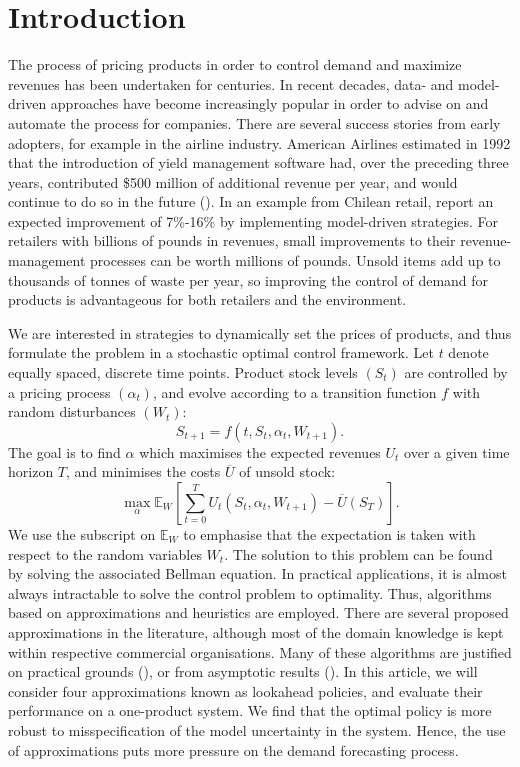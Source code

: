 \documentclass[main.tex]{subfiles}
\begin{document}
\listoftodos

\section{Introduction}
The process of pricing products in order to control demand and
maximize revenues has been undertaken for centuries. In recent
decades, data- and model-driven approaches have become increasingly
popular in order to advise on and automate the process for companies.
There are several success stories from early adopters, for example in
the airline industry. American Airlines estimated in 1992 that
the introduction of yield management software had, over the preceding
three years, contributed \$500 million of additional revenue per year,
and would continue to do so in the future (\citet{smith1992yield}).
In an example from Chilean retail, \citet{bitran1998coordinating}
report an expected improvement of 7\%-16\% by implementing
model-driven strategies.
For retailers with billions of pounds in revenues, small
improvements to their revenue-management processes can be worth millions
of pounds.
Unsold items add up to thousands of tonnes of waste per year, so
improving the control of demand for products is advantageous
for both retailers and the environment.

We are interested in strategies to dynamically set the prices of
products, and thus
formulate the problem in a stochastic optimal control framework.
Let $t$ denote equally spaced, discrete time points.
Product stock levels $(S_t)$ are controlled by a pricing process
$(\alpha_t)$, and evolve according to a transition function $f$ with random disturbances
$(W_t)$:
\begin{equation}
  S_{t+1}=f(t,S_t,\alpha_t,W_{t+1}).
\end{equation}
The goal is to find $\alpha$ which maximises the expected revenues $U_t$ over a
given time horizon $T$, and
minimises the costs $\overline{U}$ of unsold stock:
\begin{equation}
  \max_{\alpha}\mathbb E_W\left[ \sum_{t=0}^TU_t(S_t,\alpha_t,W_{t+1})
    - \overline{U}(S_T)\right].
\end{equation}
We use the subscript on $\mathbb E_W$ to emphasise that the
expectation is taken with respect to the random variables $W_t$.
The solution to this problem can be found by solving the associated
Bellman equation. In practical applications, it is almost always
intractable to solve the control problem to optimality.
Thus, algorithms based on approximations and heuristics are employed.
There are several proposed approximations in the
literature, although most of the domain knowledge is kept within
respective commercial organisations.
Many of these algorithms are justified on practical grounds
(\citet{aviv2012dynamic}), or
from asymptotic results (\citet{gallego1994optimal}).
In this article, we will consider four approximations known as
lookahead policies,
and evaluate their performance on a one-product system.
We find that the optimal policy is more robust to
misspecification of the model uncertainty in the system.
Hence, the use of approximations puts more pressure on the
demand forecasting process.
\end{document}
